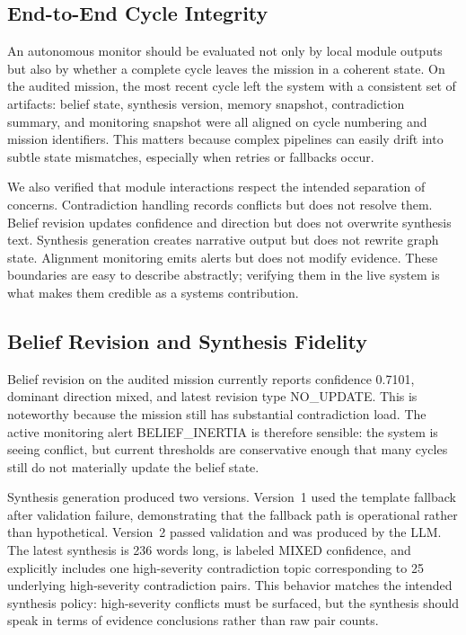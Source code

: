 \documentclass[manuscript,screen,review]{jair}
\begin{document}
\subsection{End-to-End Cycle Integrity}
An autonomous monitor should be evaluated not only by local module outputs but also by whether a complete cycle leaves the mission in a coherent state. On the audited mission, the most recent cycle left the system with a consistent set of artifacts: belief state, synthesis version, memory snapshot, contradiction summary, and monitoring snapshot were all aligned on cycle numbering and mission identifiers. This matters because complex pipelines can easily drift into subtle state mismatches, especially when retries or fallbacks occur.

We also verified that module interactions respect the intended separation of concerns. Contradiction handling records conflicts but does not resolve them. Belief revision updates confidence and direction but does not overwrite synthesis text. Synthesis generation creates narrative output but does not rewrite graph state. Alignment monitoring emits alerts but does not modify evidence. These boundaries are easy to describe abstractly; verifying them in the live system is what makes them credible as a systems contribution.

\subsection{Belief Revision and Synthesis Fidelity}
Belief revision on the audited mission currently reports confidence 0.7101, dominant direction mixed, and latest revision type NO\_UPDATE. This is noteworthy because the mission still has substantial contradiction load. The active monitoring alert BELIEF\_INERTIA is therefore sensible: the system is seeing conflict, but current thresholds are conservative enough that many cycles still do not materially update the belief state.

Synthesis generation produced two versions. Version~1 used the template fallback after validation failure, demonstrating that the fallback path is operational rather than hypothetical. Version~2 passed validation and was produced by the LLM. The latest synthesis is 236 words long, is labeled MIXED confidence, and explicitly includes one high-severity contradiction topic corresponding to 25 underlying high-severity contradiction pairs. This behavior matches the intended synthesis policy: high-severity conflicts must be surfaced, but the synthesis should speak in terms of evidence conclusions rather than raw pair counts.
\end{document}
